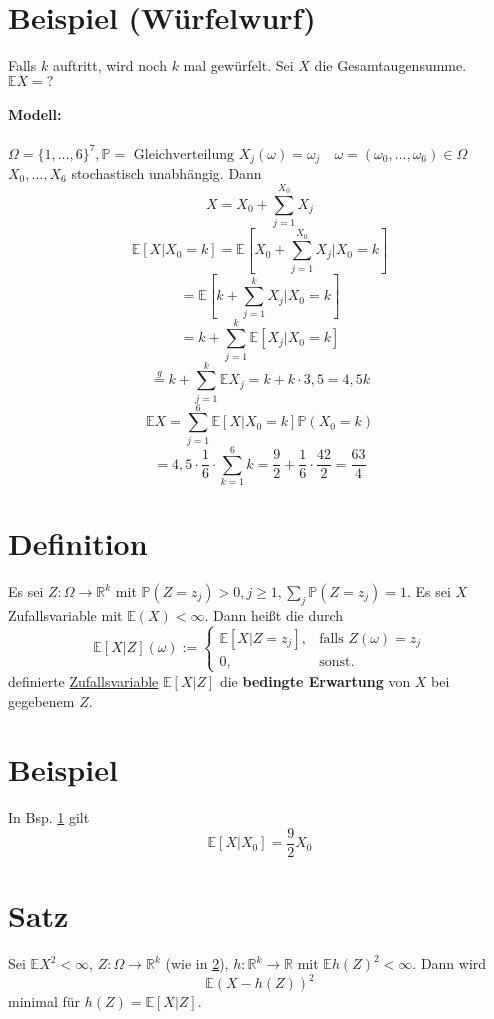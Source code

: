 \documentclass[a4paper,11pt,notitlepage]{report}
\newcommand{\R}{{\ensuremath{\mathbb{R}}}}
\newcommand{\Prim}{{\ensuremath{\mathbb{P}}}}
\newcommand{\E}{{\ensuremath{\mathbb{E}}}}
\begin{document}
\newpage

\section{Beispiel (Würfelwurf)}
\label{13.8}
Falls $k$ auftritt, wird noch $k$ mal gewürfelt.
\newline
Sei $X$ die Gesamtaugensumme.
\newline
$\E X = ?$
\paragraph{Modell:} $\Omega = \{1,\ldots,6\}^7, \Prim = \text{ Gleichverteilung}$
\newline
$X_j(\omega) = \omega_j \quad \omega = (\omega_0, \ldots, \omega_6) \in \Omega$
\newline
$X_0, \ldots, X_6$ stochastisch unabhängig. Dann
$$X = X_0 + \sum\limits_{j=1}^{X_0}{X_j}$$ 
$$\E [X | X_0 = k] = \E [X_0 + \sum\limits_{j=1}^{X_0}{X_j}|X_0 =k]$$
$$= \E [k + \sum\limits_{j=1}^k{X_j} | X_0 = k]$$
$$= k + \sum\limits_{j=1}^k{\E [X_j | X_0 = k]}$$
$$\overset{g}{=} k + \sum\limits_{j=1}^k{\E X_j} = k + k \cdot 3,5 = 4,5 k$$
$$\E X = \sum\limits_{j=1}^6{\E [X | X_0 = k] \Prim(X_0 = k)}$$
$$= 4,5 \cdot \frac{1}{6} \cdot \sum\limits_{k=1}^6{k} = \frac{9}{2} + \frac{1}{6} \cdot \frac{42}{2} = \frac{63}{4}$$

\section{Definition}
\label{13.9}
Es sei $Z \colon \Omega \rightarrow \R^k$ mit $\Prim(Z=z_j)>0, j \geq 1, \sum\limits_j{\Prim(Z=z_j)}=1$.
\newline
Es sei $X$ Zufallsvariable mit $\E(X)< \infty$. Dann heißt die durch
$$\E [X|Z](\omega) := \begin{cases} \E [X| Z = z_j], & \text{falls } Z(\omega) = z_j \\ 0, & \text{sonst.} \end{cases}$$
definierte \underline{Zufallsvariable} $\E[X|Z]$ die \textbf{bedingte Erwartung} von $X$ bei gegebenem $Z$.

\section{Beispiel}
In Bsp. \ref{13.8} gilt
$$\E [X|X_0] = \frac{9}{2} X_0$$

\section{Satz}
Sei $\E X^2 < \infty$, $Z \colon \Omega \rightarrow \R^k$ (wie in \ref{13.9}), $h \colon \R^k \rightarrow \R$ mit $\E h(Z)^2 < \infty$. Dann wird 
$$\E (X - h(Z))^2$$
minimal für $h(Z) = \E [X|Z]$.
\end{document}
